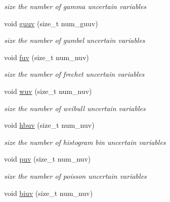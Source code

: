 \begin{DoxyCompactItemize}
\begin{DoxyCompactList}\small\item\em size the number of gamma uncertain variables \end{DoxyCompactList}\item 
void \hyperlink{classPecos_1_1AleatoryDistParams_abe38e83575dd3f15489bbd1b178bd53a}{guuv} (size\+\_\+t num\+\_\+guuv)\label{classPecos_1_1AleatoryDistParams_abe38e83575dd3f15489bbd1b178bd53a}

\begin{DoxyCompactList}\small\item\em size the number of gumbel uncertain variables \end{DoxyCompactList}\item 
void \hyperlink{classPecos_1_1AleatoryDistParams_a9db23cb7f9cc6985dab4d880741ef983}{fuv} (size\+\_\+t num\+\_\+nuv)\label{classPecos_1_1AleatoryDistParams_a9db23cb7f9cc6985dab4d880741ef983}

\begin{DoxyCompactList}\small\item\em size the number of frechet uncertain variables \end{DoxyCompactList}\item 
void \hyperlink{classPecos_1_1AleatoryDistParams_a9e9d3f4e77868f6620f603e17b77ff89}{wuv} (size\+\_\+t num\+\_\+nuv)\label{classPecos_1_1AleatoryDistParams_a9e9d3f4e77868f6620f603e17b77ff89}

\begin{DoxyCompactList}\small\item\em size the number of weibull uncertain variables \end{DoxyCompactList}\item 
void \hyperlink{classPecos_1_1AleatoryDistParams_a75482df39dd212cb3c443b392b7e9387}{hbuv} (size\+\_\+t num\+\_\+nuv)\label{classPecos_1_1AleatoryDistParams_a75482df39dd212cb3c443b392b7e9387}

\begin{DoxyCompactList}\small\item\em size the number of histogram bin uncertain variables \end{DoxyCompactList}\item 
void \hyperlink{classPecos_1_1AleatoryDistParams_acf61d50234ee1060b497cad61dbe0501}{puv} (size\+\_\+t num\+\_\+nuv)\label{classPecos_1_1AleatoryDistParams_acf61d50234ee1060b497cad61dbe0501}

\begin{DoxyCompactList}\small\item\em size the number of poisson uncertain variables \end{DoxyCompactList}\item 
void \hyperlink{classPecos_1_1AleatoryDistParams_a99da69933822db47de798c1155024559}{biuv} (size\+\_\+t num\+\_\+nuv)\label{classPecos_1_1AleatoryDistParams_a99da69933822db47de798c1155024559}


\end{DoxyCompactItemize}
